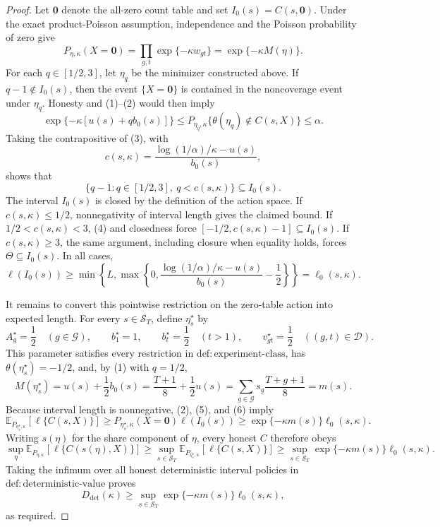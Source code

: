 \documentclass{article}
\begin{document}
\begin{proof}
Let \(\mathbf 0\) denote the all-zero count table and set \(I_0(s)=C(s,\mathbf 0)\).  Under the exact product-Poisson assumption, independence and the Poisson probability of zero give
\[
 P_{\eta,\kappa}(X=\mathbf 0)
 =\prod_{g,t}\exp\{-\kappa w_{gt}\}
 =\exp\{-\kappa M(\eta)\}.
 \tag{2}
\]
For each \(q\in[1/2,3]\), let \(\eta_q\) be the minimizer constructed above.  If \(q-1\notin I_0(s)\), then the event \(\{X=\mathbf 0\}\) is contained in the noncoverage event under \(\eta_q\).  Honesty and (1)--(2) would then imply
\[
 \exp\{-\kappa[u(s)+qb_0(s)]\}
 \le P_{\eta_q,\kappa}\{\theta(\eta_q)\notin C(s,X)\}
 \le\alpha.
 \tag{3}
\]
Taking the contrapositive of (3), with
\[
 c(s,\kappa)=
 \frac{\log(1/\alpha)/\kappa-u(s)}{b_0(s)},
\]
shows that
\[
 \{q-1:q\in[1/2,3],\ q<c(s,\kappa)\}\subseteq I_0(s).
 \tag{4}
\]
The interval \(I_0(s)\) is closed by the definition of the action space.  If \(c(s,\kappa)\le1/2\), nonnegativity of interval length gives the claimed bound.  If \(1/2<c(s,\kappa)<3\), (4) and closedness force \([-1/2,c(s,\kappa)-1]\subseteq I_0(s)\).  If \(c(s,\kappa)\ge3\), the same argument, including closure when equality holds, forces \(\Theta\subseteq I_0(s)\).  In all cases,
\[
 \ell(I_0(s))
 \ge
 \min\!\left\{L,
 \max\!\left\{0,
 \frac{\log(1/\alpha)/\kappa-u(s)}{b_0(s)}-\frac12
 \right\}\right\}
 =\ell_0(s,\kappa).
 \tag{5}
\]

It remains to convert this pointwise restriction on the zero-table action into expected length.  For every \(s\in\mathcal S_T\), define \(\eta_s^{\star}\) by
\[
 A_g^{\star}=\frac12\quad(g\in\mathcal G),\qquad
 b_1^{\star}=1,\qquad b_t^{\star}=\frac12\quad(t>1),\qquad
 v_{gt}^{\star}=\frac12\quad((g,t)\in\mathcal D).
\]
This parameter satisfies every restriction in \(\mathrm{def{:}experiment\text{-}class}\), has \(\theta(\eta_s^{\star})=-1/2\), and, by (1) with \(q=1/2\),
\[
 M(\eta_s^{\star})
 =u(s)+\frac12b_0(s)
 =\frac{T+1}{8}+\frac12u(s)
 =\sum_{g\in\mathcal G}s_g\frac{T+g+1}{8}
 =m(s).
 \tag{6}
\]
Because interval length is nonnegative, (2), (5), and (6) imply
\[
 \mathbb E_{P_{\eta_s^{\star},\kappa}}\!\left[\ell\{C(s,X)\}\right]
 \ge P_{\eta_s^{\star},\kappa}(X=\mathbf 0)\ell(I_0(s))
 \ge \exp\{-\kappa m(s)\}\ell_0(s,\kappa).
\]
Writing \(s(\eta)\) for the share component of \(\eta\), every honest \(C\) therefore obeys
\[
 \sup_{\eta}\mathbb E_{P_{\eta,\kappa}}\!\left[\ell\{C(s(\eta),X)\}\right]
 \ge
 \sup_{s\in\mathcal S_T}
 \mathbb E_{P_{\eta_s^{\star},\kappa}}\!\left[\ell\{C(s,X)\}\right]
 \ge
 \sup_{s\in\mathcal S_T}\exp\{-\kappa m(s)\}\ell_0(s,\kappa).
\]
Taking the infimum over all honest deterministic interval policies in \(\mathrm{def{:}deterministic\text{-}value}\) proves
\[
 D_{\mathrm{det}}(\kappa)
 \ge\sup_{s\in\mathcal S_T}\exp\{-\kappa m(s)\}\ell_0(s,\kappa),
\]
as required.
\end{proof}
\end{document}
